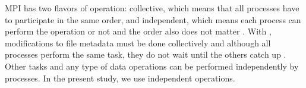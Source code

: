 MPI has two flavors of operation: collective, which means that all processes have to participate in the same order, and independent, which means each process can perform the operation or not and the order also does not matter  \cite{pythonhdf5}.
With , modifications to file metadata must be done collectively and although all processes perform the same task, they do not wait until the others catch up \cite{pythonhdf5}. 
Other tasks and any type of data operations can be performed independently by processes.
In the present study, we use independent operations.
